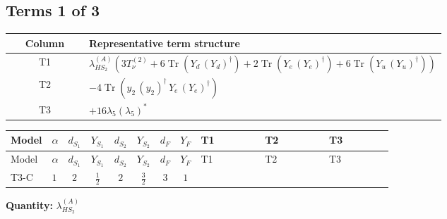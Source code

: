 \documentclass[8pt]{article}
\begin{document}
\begin{landscape}
\subsection*{Terms 1 of 3}
\begin{center}
\begin{tabular}{@{}c >{\raggedright\arraybackslash}p{0.82\linewidth}@{}}
\toprule
Column & Representative term structure \\
\midrule
T1 & \(\displaystyle {\lambda_{HS_2}^{(A)}} (3 T_{\nu}^{(2)}+6 \operatorname{Tr}\!\left({Y_d}\,\left({Y_d}\right)^{\dagger}\right)+2 \operatorname{Tr}\!\left({Y_e}\,\left({Y_e}\right)^{\dagger}\right)+6 \operatorname{Tr}\!\left({Y_u}\,\left({Y_u}\right)^{\dagger}\right))\) \\
\midrule
T2 & \(\displaystyle -4 \operatorname{Tr}\!\left({y_2}\,\left({y_2}\right)^{\dagger}\,{Y_e}\,\left({Y_e}\right)^{\dagger}\right)\) \\
\midrule
T3 & \(\displaystyle +16 {\lambda_5} \left({\lambda_5}\right)^{*}\) \\
\midrule
\bottomrule
\end{tabular}
\end{center}
\smallskip
\tiny
\begin{longtable}{@{}llcccccc >{\raggedright\arraybackslash}p{0.21\linewidth} >{\raggedright\arraybackslash}p{0.21\linewidth} >{\raggedright\arraybackslash}p{0.21\linewidth}@{}}
\toprule
Model & $\alpha$ & $d_{S_1}$ & $Y_{S_1}$ & $d_{S_2}$ & $Y_{S_2}$ & $d_F$ & $Y_F$ & T1 & T2 & T3 \\
\midrule
\endfirsthead
\toprule
Model & $\alpha$ & $d_{S_1}$ & $Y_{S_1}$ & $d_{S_2}$ & $Y_{S_2}$ & $d_F$ & $Y_F$ & T1 & T2 & T3 \\
\midrule
\endhead
T3-C & $1$ & $2$ & $\frac{1}{2}$ & $2$ & $\frac{3}{2}$ & $3$ & $1$ & \scriptsize\adjustbox{max width=\linewidth}{$\begin{gathered} {\lambda_{HS_2}^{(A)}} (3 T_{\nu}^{(2)}+6 \operatorname{Tr}\!\left({Y_d}\,\left({Y_d}\right)^{\dagger}\right)+2 \operatorname{Tr}\!\left({Y_e}\,\left({Y_e}\right)^{\dagger}\right)+6 \operatorname{Tr}\!\left({Y_u}\,\left({Y_u}\right)^{\dagger}\right))\end{gathered}$} & \scriptsize\adjustbox{max width=\linewidth}{$\begin{gathered} -4 \operatorname{Tr}\!\left({y_2}\,\left({y_2}\right)^{\dagger}\,{Y_e}\,\left({Y_e}\right)^{\dagger}\right)\end{gathered}$} & \scriptsize\adjustbox{max width=\linewidth}{$\begin{gathered} +16 {\lambda_5} \left({\lambda_5}\right)^{*}\end{gathered}$} \\
\midrule
\bottomrule
\end{longtable}
\clearpage
\noindent\textbf{Quantity: }$\lambda_{HS_2}^{(A)}$\par\smallskip

\end{landscape}
\end{document}
